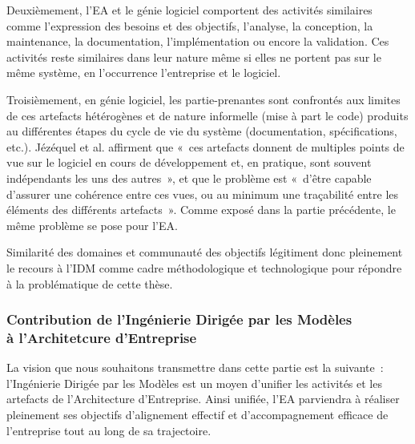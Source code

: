     Deuxièmement, l'EA et le génie logiciel comportent des activités
    similaires comme l'expression des besoins et des objectifs, l'analyse,
    la conception, la maintenance, la documentation, l'implémentation ou encore
    la validation. Ces activités reste similaires dans leur nature même
    si elles ne portent pas sur le même système, en l'occurrence l'entreprise et
    le logiciel.

    Troisièmement, en génie logiciel, les partie-prenantes sont
    confrontés aux limites de ces artefacts hétérogènes et de nature informelle (mise à
    part le code) produits au différentes étapes du cycle de vie du système (documentation,
    spécifications, etc.). Jézéquel et al. \cite{jezequel2006genie} affirment
    que «~ces artefacts donnent de multiples points de vue sur le
    logiciel en cours de développement et, en pratique, sont souvent
    indépendants les uns des autres~», et que le problème est «~d’être
    capable d'assurer une cohérence entre ces vues, ou au minimum une
    traçabilité entre les éléments des différents artefacts~».
    Comme exposé dans la partie précédente, le même problème se pose pour l'EA.


    Similarité des domaines et communauté des objectifs légitiment
    donc pleinement le recours à l'IDM comme cadre
    méthodologique et technologique pour répondre à la problématique de
    cette thèse.

    \subsubsection{Contribution de l'Ingénierie Dirigée par les Modèles\\à l'Architetcure d'Entreprise}

    La vision que nous souhaitons transmettre dans cette partie est la suivante~:
    l'Ingénierie Dirigée par les Modèles est un moyen d'unifier les activités
    et les artefacts de l'Architecture d'Entreprise. Ainsi unifiée, l'EA parviendra à réaliser
    pleinement ses objectifs d'alignement effectif et d'accompagnement efficace de
    l'entreprise tout au long de sa trajectoire.

